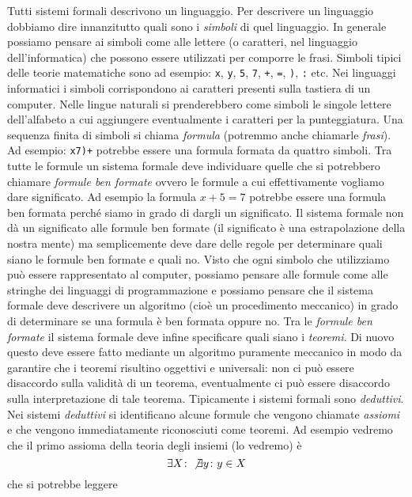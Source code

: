 Tutti sistemi formali descrivono un linguaggio.
Per descrivere un linguaggio dobbiamo dire innanzitutto quali sono i \emph{simboli}%
%
di quel linguaggio. In generale possiamo pensare ai simboli come alle lettere 
(o caratteri, nel linguaggio dell'informatica) che possono essere utilizzati per comporre le frasi.
Simboli tipici delle teorie matematiche sono ad esempio: 
\texttt{x}, \texttt{y}, \texttt{5}, \texttt{7}, 
\texttt{+}, \texttt{=}, \texttt{)}, \texttt{:} etc.
Nei linguaggi informatici i simboli corrispondono ai caratteri presenti sulla tastiera 
di un computer. 
Nelle lingue naturali si prenderebbero come simboli le singole lettere dell'alfabeto
a cui aggiungere eventualmente i caratteri per la punteggiatura.
Una sequenza finita di simboli si chiama \emph{formula}%
%
 (potremmo anche chiamarle \emph{frasi}).
Ad esempio: \texttt{x7)+} potrebbe essere una formula formata da quattro simboli.
Tra tutte le formule un sistema formale deve individuare quelle che si potrebbero chiamare 
\emph{formule ben formate} ovvero le formule a cui effettivamente vogliamo dare significato.
Ad esempio la formula $x+5=7$ potrebbe essere una formula ben formata perché siamo in grado 
di dargli un significato.
Il sistema formale non dà un significato alle formule ben formate 
(il significato è una estrapolazione della nostra mente) ma semplicemente deve dare delle regole 
per determinare quali siano le formule ben formate e quali no.
Visto che ogni simbolo che utilizziamo può essere rappresentato al computer, possiamo pensare 
alle formule come alle stringhe dei linguaggi di programmazione e possiamo pensare che il sistema formale 
deve descrivere un algoritmo (cioè un procedimento meccanico) in grado di determinare 
se una formula è ben formata oppure no.
Tra le \emph{formule ben formate} il sistema formale deve infine specificare quali 
siano i \emph{teoremi}. 
Di nuovo questo deve essere fatto mediante un algoritmo puramente meccanico 
in modo da garantire che i teoremi risultino oggettivi e universali: 
non ci può essere disaccordo sulla validità di un teorema, eventualmente 
ci può essere disaccordo 
sulla interpretazione di tale teorema.
Tipicamente i sistemi formali sono \emph{deduttivi}.
Nei sistemi \emph{deduttivi} si identificano alcune formule che vengono 
chiamate
 \emph{assiomi} e che vengono immediatamente riconosciuti come teoremi.
Ad esempio vedremo che il primo assioma della teoria degli insiemi (lo vedremo) è 
\[
  \exists X\colon \not \exists y\colon y\in X
\]
che si potrebbe leggere 
